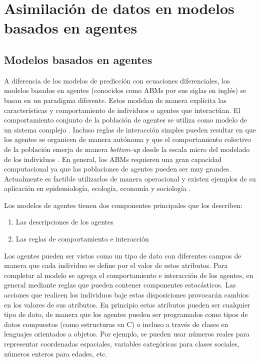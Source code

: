 \chapter{Asimilación de datos en modelos basados en agentes} \label{chp:da_abms}

\section{Modelos basados en agentes}

A diferencia de los modelos de predicción con ecuaciones diferenciales, los modelos basados en agentes (conocidos como ABMs por sus siglas en inglés) se basan en un paradigma diferente. Estos modelan de manera explícita las características y comportamiento de individuos o agentes que interactúan. El comportamiento conjunto de la población de agentes se utiliza como modelo de un sistema complejo \citep{Bonabeau2002}. Incluso reglas de interacción simples pueden resultar en que los agentes se organicen de manera autónoma y que el comportamiento colectivo de la población emerja de manera \textit{bottom-up} desde la escala micro del modelado de los individuos \citep{Helbing2012}. En general, los ABMs requieren una gran capacidad computacional ya que las poblaciones de agentes pueden ser muy grandes. Actualmente es factible utilizarlos de manera operacional y existen ejemplos de su aplicación en epidemiología, ecología, economía y sociología \citep{Vynnycky2010, Grimm2005, Tesfatsion2006, Epstein1996}.

Los modelos de agentes tienen dos componentes principales que los describen: 
\begin{enumerate}
    \item Las descripciones de los agentes
    \item Las reglas de comportamiento e interacción
\end{enumerate}
Los agentes pueden ser vistos como un tipo de dato con diferentes campos de manera que cada individuo se define por el valor de estos atributos. Para completar al modelo se agrega el comportamiento e interacción de los agentes, en general mediante reglas que pueden contener componentes estocásticos. Las acciones que realicen los individuos baje estas disposiciones provocarán cambios en los valores de sus atributos. En principio estos atributos pueden ser cualquier tipo de dato, de manera que los agentes pueden ser programados como tipos de datos compuestos (como estructuras en C) o incluso a través de clases en lenguajes orientados a objetos. Por ejemplo, se pueden usar números reales para representar coordenadas espaciales, variables categóricas para clases sociales, números enteros para edades, etc.

